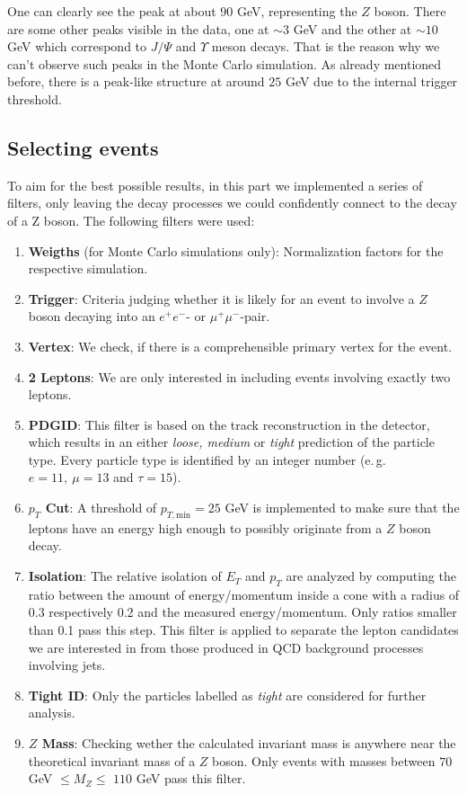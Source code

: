 \documentclass[twocolumn,
			   showpacs,%
               nofootinbib,
               aps,%
               prd,
               notitlepage,
               showkeys,
               10pt]{revtex4-1}
\begin{document}
One can clearly see the peak at about $90$ GeV, representing the $Z$ boson. There are some other peaks visible in the data, one at $\sim 3$ GeV and the other at $\sim 10$ GeV which correspond to $J/\Psi$ and $\Upsilon$ meson decays. That is the reason why we can't observe such peaks in the Monte Carlo simulation. As already mentioned before, there is a peak-like structure at around $25$ GeV due to the internal trigger threshold.

\subsection{Selecting events}
To aim for the best possible results, in this part we implemented a series of filters, only leaving the decay processes we could confidently connect to the decay of a Z boson.
The following filters were used:
\begin{enumerate}
\item \textbf{Weigths} (for Monte Carlo simulations only): Normalization factors for the respective simulation.
\item \textbf{Trigger}: Criteria judging whether it is likely for an event to involve a $Z$ boson decaying into an $e^{+}e^{-}$- or $\mu^{+}\mu^{-}$-pair.
\item \textbf{Vertex}: We check, if there is a comprehensible primary vertex for the event.
\item \textbf{2 Leptons}: We are only interested in including events involving exactly two leptons.

\item \textbf{PDGID}: This filter is based on the track reconstruction in the detector, which results in an either \textit{loose, medium} or \textit{tight} prediction of the particle type. Every particle type is identified by an integer number (e.\,g. $e = 11 , \ \mu = 13$ and $\tau = 15$).
\item \textbf{$p_T$ Cut}: A threshold of $p_{T,\text{min}} = 25$ GeV is implemented to make sure that the leptons have an energy high enough to possibly originate from a $Z$ boson decay.

\item \textbf{Isolation}: The relative isolation of $E_T$ and $p_T$ are analyzed by computing the ratio between the amount of energy/momentum inside a cone with a radius of 0.3 respectively 0.2 and the measured energy/momentum. Only ratios smaller than 0.1 pass this step. This filter is applied to separate the lepton candidates we are interested in from those produced in QCD background processes involving jets.  

\item \textbf{Tight ID}: Only the particles labelled as \textit{tight} are considered for further analysis.
\item \textbf{$Z$ Mass}: Checking wether the calculated invariant mass is anywhere near the theoretical invariant mass of a $Z$ boson. Only events with masses between $70$ GeV $ \leq M_Z \leq$  $110$ GeV pass this filter.
\end{enumerate}
\end{document}
